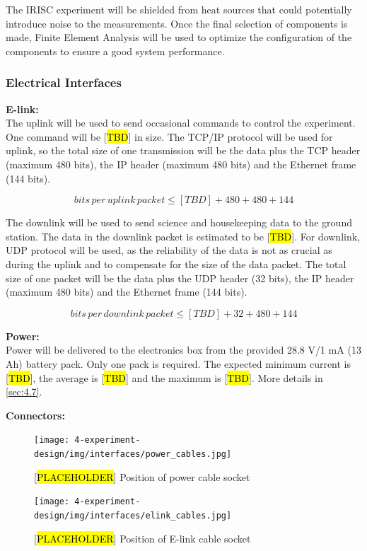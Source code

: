 The IRISC experiment will be shielded from heat sources that could potentially introduce noise to the measurements. Once the final selection of components is made, Finite Element Analysis will be used to optimize the configuration of the components to ensure a good system performance.

\label{sec:4.2.2}


\subsubsection{Electrical Interfaces}
\label{sec:4.2.3}
\textbf{E-link:}\\
The uplink will be used to send occasional commands to control the experiment. One command will be [\hl{TBD}] in size. The TCP/IP protocol will be used for uplink, so the total size of one transmission will be the data plus the TCP header (maximum 480 bits), the IP header (maximum 480 bits) and the Ethernet frame (144 bits).

$$ bits\, per\, uplink\, packet \leq [TBD] + 480 + 480 + 144 $$

The downlink will be used to send science and housekeeping data to the ground station. The data in the downlink packet is estimated to be [\hl{TBD}]. For downlink, UDP protocol will be used, as the reliability of the data is not as crucial as during the uplink and to compensate for the size of the data packet. The total size of one packet will be the data plus the UDP header (32 bits), the IP header (maximum 480 bits) and the Ethernet frame (144 bits).

$$ bits\, per\, downlink\, packet \leq [TBD] + 32 + 480 + 144 $$

\textbf{Power:}\\

Power will be delivered to the electronics box from the provided 28.8 V/1 mA (13 Ah) battery pack. Only one pack is required. The expected minimum current is [\hl{TBD}], the average is [\hl{TBD}] and the maximum is [\hl{TBD}]. More details in \ref{sec:4.7}.

\textbf{Connectors:}\\

\begin{figure}[H]
    \centering
	\texttt{[image: 4-experiment-design/img/interfaces/power\_cables.jpg]}
	\caption{[\hl{PLACEHOLDER}] Position of power cable socket}
	\label{fig:power_cables}
\end{figure}

\begin{figure}[H]
    \centering
	\texttt{[image: 4-experiment-design/img/interfaces/elink\_cables.jpg]}
	\caption{[\hl{PLACEHOLDER}] Position of E-link cable socket}
	\label{fig:elink_cables}
\end{figure}

